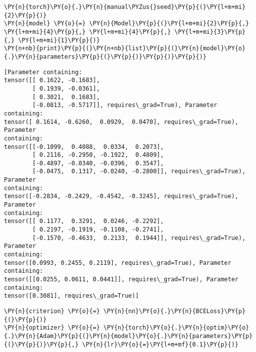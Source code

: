     \begin{tcolorbox}[breakable, size=fbox, boxrule=1pt, pad at break*=1mm,colback=cellbackground, colframe=cellborder]
\begin{Verbatim}[commandchars=\\\{\}]
\PY{n}{torch}\PY{o}{.}\PY{n}{manual\PYZus{}seed}\PY{p}{(}\PY{l+m+mi}{2}\PY{p}{)}
\PY{n}{model} \PY{o}{=} \PY{n}{Model}\PY{p}{(}\PY{l+m+mi}{2}\PY{p}{,} \PY{l+m+mi}{4}\PY{p}{,} \PY{l+m+mi}{4}\PY{p}{,} \PY{l+m+mi}{3}\PY{p}{,} \PY{l+m+mi}{1}\PY{p}{)}
\PY{n+nb}{print}\PY{p}{(}\PY{n+nb}{list}\PY{p}{(}\PY{n}{model}\PY{o}{.}\PY{n}{parameters}\PY{p}{(}\PY{p}{)}\PY{p}{)}\PY{p}{)}
\end{Verbatim}
\end{tcolorbox}

    \begin{Verbatim}[commandchars=\\\{\}]
[Parameter containing:
tensor([[ 0.1622, -0.1683],
        [ 0.1939, -0.0361],
        [ 0.3021,  0.1683],
        [-0.0813, -0.5717]], requires\_grad=True), Parameter containing:
tensor([ 0.1614, -0.6260,  0.0929,  0.0470], requires\_grad=True), Parameter
containing:
tensor([[-0.1099,  0.4088,  0.0334,  0.2073],
        [ 0.2116, -0.2950, -0.1922,  0.4809],
        [-0.4897, -0.0340, -0.0396,  0.3547],
        [-0.0475,  0.1317, -0.0240, -0.2800]], requires\_grad=True), Parameter
containing:
tensor([-0.2834, -0.2429, -0.4542, -0.3245], requires\_grad=True), Parameter
containing:
tensor([[ 0.1177,  0.3291,  0.0246, -0.2292],
        [ 0.2197, -0.1919, -0.1108, -0.2741],
        [-0.1570, -0.4633,  0.2133,  0.1944]], requires\_grad=True), Parameter
containing:
tensor([0.0993, 0.2455, 0.2119], requires\_grad=True), Parameter containing:
tensor([[0.0255, 0.0611, 0.0441]], requires\_grad=True), Parameter containing:
tensor([0.3081], requires\_grad=True)]
    \end{Verbatim}

    \begin{tcolorbox}[breakable, size=fbox, boxrule=1pt, pad at break*=1mm,colback=cellbackground, colframe=cellborder]
\begin{Verbatim}[commandchars=\\\{\}]
\PY{n}{criterion} \PY{o}{=} \PY{n}{nn}\PY{o}{.}\PY{n}{BCELoss}\PY{p}{(}\PY{p}{)}
\PY{n}{optimizer} \PY{o}{=} \PY{n}{torch}\PY{o}{.}\PY{n}{optim}\PY{o}{.}\PY{n}{Adam}\PY{p}{(}\PY{n}{model}\PY{o}{.}\PY{n}{parameters}\PY{p}{(}\PY{p}{)}\PY{p}{,} \PY{n}{lr}\PY{o}{=}\PY{l+m+mf}{0.1}\PY{p}{)}
\end{Verbatim}
\end{tcolorbox}

